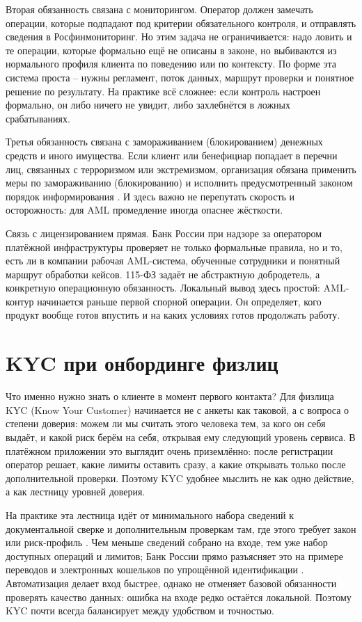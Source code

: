 Вторая обязанность связана с мониторингом. Оператор должен замечать
операции, которые подпадают под критерии обязательного контроля,
и отправлять сведения в Росфинмониторинг. Но этим задача не
ограничивается: надо ловить и те операции, которые формально ещё не
описаны в законе, но выбиваются из нормального профиля клиента по
поведению или по контексту. По форме эта система проста -- нужны
регламент, поток данных, маршрут проверки и понятное решение по
результату. На практике всё сложнее: если контроль настроен
формально, он либо ничего не увидит, либо захлебнётся в ложных
срабатываниях.

Третья обязанность связана с замораживанием (блокированием) денежных
средств и иного имущества. Если клиент или бенефициар попадает в
перечни лиц, связанных с терроризмом или экстремизмом, организация
обязана применить меры по замораживанию (блокированию) и исполнить
предусмотренный законом порядок информирования
\cite{fz-115}. И здесь важно не перепутать скорость и
осторожность: для AML промедление иногда опаснее жёсткости.

Связь с лицензированием прямая. Банк России при надзоре за
оператором платёжной инфраструктуры проверяет не только формальные
правила, но и то, есть ли в компании рабочая AML-система,
обученные сотрудники и понятный маршрут обработки кейсов. 115-ФЗ
задаёт не абстрактную добродетель, а конкретную операционную
обязанность. Локальный вывод здесь простой: AML-контур начинается
раньше первой спорной операции. Он определяет, кого продукт вообще
готов впустить и на каких условиях готов продолжать работу.

\section{KYC при онбординге физлиц}
\label{sec:compliance-kyc}

Что именно нужно знать о клиенте в момент первого контакта? Для
физлица KYC (Know Your Customer) начинается не с анкеты как таковой,
а с вопроса о степени доверия: можем ли мы считать этого человека
тем, за кого он себя выдаёт, и какой риск берём на себя, открывая
ему следующий уровень сервиса. В платёжном приложении это выглядит
очень приземлённо: после регистрации оператор решает, какие лимиты
оставить сразу, а какие открывать только после дополнительной
проверки. Поэтому KYC удобнее мыслить не как одно действие, а как
лестницу уровней доверия.

На практике эта лестница идёт от минимального набора сведений к
документальной сверке и дополнительным проверкам там, где этого
требует закон или риск-профиль \cite{cbr-499p}. Чем меньше
сведений собрано на входе, тем уже набор доступных операций и
лимитов; Банк России прямо разъясняет это на примере переводов и
электронных кошельков по упрощённой идентификации
\cite{cbr-banking-faq-identification}. Автоматизация делает вход
быстрее, однако не отменяет базовой обязанности проверять качество
данных: ошибка на входе редко остаётся локальной. Поэтому KYC почти
всегда балансирует между удобством и точностью.

